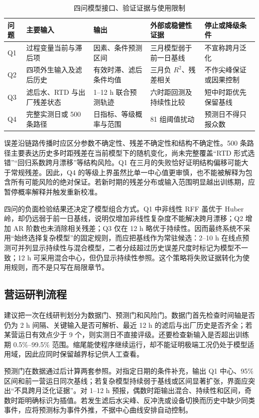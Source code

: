 \documentclass[UTF8,12pt,a4paper]{ctexart}
\newcommand{\Rtwo}{R^{2}}
\begin{document}
\begin{table}[htbp]
\centering
\caption{四问模型接口、验证证据与使用限制}
\label{tab:modelchain}
\begin{tabular}{L{0.7cm}L{3.0cm}L{3.3cm}L{3.5cm}L{3.0cm}}
\toprule
问题 & 主要输入 & 输出 & 外部或稳健性证据 & 停止或降级条件\\
\midrule
Q1 & 过程变量当前与滞后项 & 因素、条件预测区间 & 三月模型弱于前一日基线 & 不宣称跨月泛化\\
Q2 & 四项外生输入及滤后历史 & 有效时滞、滤后条件均值 & 三月负 $\Rtwo$、残差相关 & 不作尖峰保证或因果控制\\
Q3 & 滤后水、RTD 与出厂残差状态 & 1--12 h 联合预测轨迹 & 六时距回测及持续性比较 & 短中时距优先保留基线\\
Q4 & 完整实测日或 500 条路径 & 日指标、等级概率与范围 & 81 组阈值扰动 & 预测日不得只报众数\\
\bottomrule
\end{tabular}
\end{table}

误差沿链路传播时应区分参数不确定性、残差不确定性和结构不确定性。500 条路径主要表达历史多时距残差在当前模型下的随机变化，尚未完整覆盖“RTD 形式选错”“回归系数跨月漂移”等结构风险。Q1 在三月的失败恰好证明结构偏移可能大于常规残差。因此，Q4 的等级上界虽然比单一中心值更审慎，也不能被解释为包含所有可能风险的绝对保证。若新时期的残差分布或输入范围明显越出训练期，应暂停概率解释并触发重新校准。

四问的负面检验结果还决定了模型组合方式。Q1 中非线性 RFF 虽优于 Huber 岭，却仍远弱于前一日基线，说明仅增加非线性复杂度不能解决跨月漂移；Q2 增加 AR 阶数也未消除相关残差；Q3 仅在 12 h 略优于持续性。因而最终系统不采用“始终选择复杂模型”的固定规则，而应把基线作为常驻候选：2--10 h 在线点预测可并列显示持续性与混合模型，二者分歧超过历史误差尺度时标记为模型不一致；12 h 可采用混合中心，但仍显示持续性参照。这个策略将失败证据转化为使用规则，而不是只写在局限章节。

\subsection{营运研判流程}

建议把一次在线研判划分为数据门、预测门和风险门。数据门首先检查时间轴是否仍为 2 h 间隔、关键输入是否可解析、最近 12 h 的滤后与出厂历史是否齐全；若某营运日有效点少于 9 个，则实测日不直接评级。还要检查新输入是否超出训练期 0.5\%--99.5\% 范围。缩尾能使程序继续运行，却不能证明极端工况仍处于模型适用域，因此应同时保留越界标记供人工查看。

预测门在数据通过后计算两套参照。对指定日期的条件补充，输出 Q1 中心、95\% 区间和前一营运日同次基线；若复杂模型持续弱于基线或区间显著扩张，界面应突出“不具跨月泛化证据”。对 1--12 h 预报，偶数时距输出混合、持续性和区间，奇数时距明确标识为插值。若发生滤后水尖峰、反冲洗或设备切换而历史中缺少同类事件，应将预测标为事件外推，不据中心曲线安排自动控制。
\end{document}
